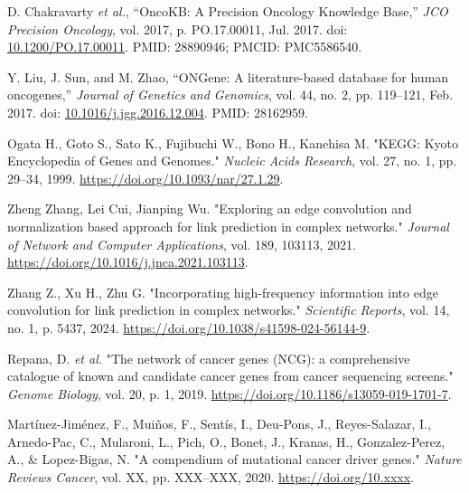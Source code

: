 \documentclass[conference]{IEEEtran}
\begin{document}
\begin{thebibliography}{99}
%

D. Chakravarty \textit{et al.}, ``OncoKB: A Precision Oncology Knowledge Base,'' \textit{JCO Precision Oncology}, vol. 2017, p. PO.17.00011, Jul. 2017. doi: \url{10.1200/PO.17.00011}. PMID: 28890946; PMCID: PMC5586540.

Y. Liu, J. Sun, and M. Zhao, ``ONGene: A literature-based database for human oncogenes,'' \textit{Journal of Genetics and Genomics}, vol. 44, no. 2, pp. 119–121, Feb. 2017. doi: \url{10.1016/j.jgg.2016.12.004}. PMID: 28162959.


Ogata H., Goto S., Sato K., Fujibuchi W., Bono H., Kanehisa M. "KEGG: Kyoto Encyclopedia of Genes and Genomes." \textit{Nucleic Acids Research}, vol. 27, no. 1, pp. 29–34, 1999. \url{https://doi.org/10.1093/nar/27.1.29}.


Zheng Zhang, Lei Cui, Jianping Wu. "Exploring an edge convolution and normalization based approach for link prediction in complex networks." \textit{Journal of Network and Computer Applications}, vol. 189, 103113, 2021. \url{https://doi.org/10.1016/j.jnca.2021.103113}.

Zhang Z., Xu H., Zhu G. "Incorporating high-frequency information into edge convolution for link prediction in complex networks." \textit{Scientific Reports}, vol. 14, no. 1, p. 5437, 2024. \url{https://doi.org/10.1038/s41598-024-56144-9}.

Repana, D. \textit{et al.} "The network of cancer genes (NCG): a comprehensive catalogue of known and candidate cancer genes from cancer sequencing screens." \textit{Genome Biology}, vol. 20, p. 1, 2019. \url{https://doi.org/10.1186/s13059-019-1701-7}.


Martínez-Jiménez, F., Muiños, F., Sentís, I., Deu-Pons, J., Reyes-Salazar, I., Arnedo-Pac, C., Mularoni, L., Pich, O., Bonet, J., Kranas, H., Gonzalez-Perez, A., \& Lopez-Bigas, N. "A compendium of mutational cancer driver genes." \textit{Nature Reviews Cancer}, vol. XX, pp. XXX–XXX, 2020. \url{https://doi.org/10.xxxx}.



\end{thebibliography}
\end{document}
